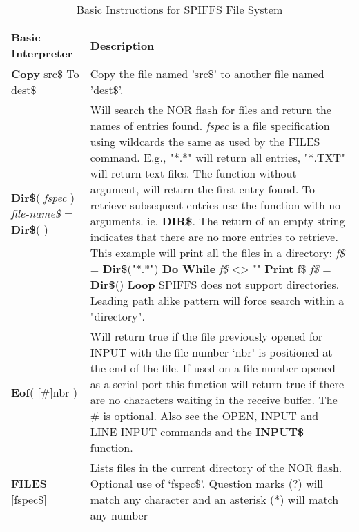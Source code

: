 \begin{table}[]
\centering
\caption{Basic Instructions for SPIFFS File System}
\label{Basic_Instructions_for_SPIFFS_File_System}
\begin{tabular}{|p{4cm}|p{10cm}|}
\hline
\textbf{Basic Interpreter} & \textbf{Description}                                                   
\\ \hline
\textbf{Copy} src\$ To dest\$ & Copy the file named 'src\$' to another file named 'dest\$'.
\\ \hline
\textbf{Dir\$}( \textit{fspec} )\newline
\textit{file-name\$} = \textbf{Dir\$}( )\newline
& Will search the NOR flash for files and return the names of entries found.
\textit{fspec} is a file specification using wildcards the same as used by the
FILES command. E.g., "*.*" will return all entries, "*.TXT" will return
text files.\newline
The function without argument, will return the first entry found. To retrieve subsequent
entries use the function with no arguments. ie, \textbf{DIR\$}. The return of
an empty string indicates that there are no more entries to retrieve.\newline
This example will print all the files in a directory:\newline
\textit{f\$} = \textbf{Dir\$}("*.*")\newline
\textbf{Do While} \textit{f\$} <> ""\newline
\textbf{Print} f\$\newline
\textit{f\$} = \textbf{Dir\$}()\newline
\textbf{Loop}\newline
SPIFFS does not support directories. Leading path alike pattern will force search within a "directory".
\\ \hline
\textbf{Eof}( [\#]nbr ) & Will return true if the file previously opened for INPUT with the file
number ‘nbr’ is positioned at the end of the file.
If used on a file number opened as a serial port this function will return
true if there are no characters waiting in the receive buffer.
The \# is optional. Also see the OPEN, INPUT and LINE INPUT
commands and the \textbf{INPUT\$} function.
\\ \hline
\textbf{FILES} [fspec\$] 
&  Lists files in the current directory of the NOR flash.\newline
Optional use of ‘fspec\$’. Question marks
(?) will match any character and an asterisk (*) will match any number

\end{tabular}
\end{table}
